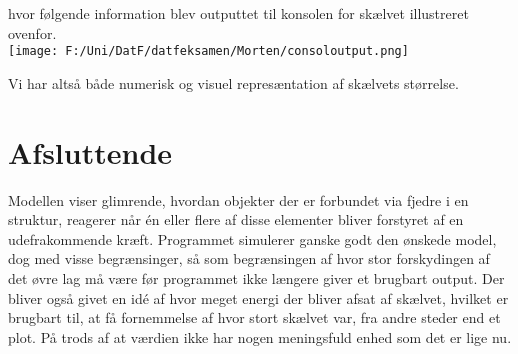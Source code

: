 \documentclass[12pt]{article}
\begin{document}
hvor følgende information blev outputtet til konsolen for skælvet illustreret ovenfor.\\

\texttt{[image: F:/Uni/DatF/datfeksamen/Morten/consoloutput.png]}

Vi har altså både numerisk og visuel represæntation af skælvets størrelse.


\section{Afsluttende}
Modellen viser glimrende, hvordan objekter der er forbundet via fjedre i en struktur, reagerer når én eller flere af disse elementer bliver forstyret af en udefrakommende kræft. Programmet simulerer ganske godt den ønskede model, dog med visse begrænsinger, så som begrænsingen af hvor stor forskydingen af det øvre lag må være før programmet ikke længere giver et brugbart output. Der bliver også givet en idé af hvor meget energi der bliver afsat af skælvet, hvilket er brugbart til, at få fornemmelse af hvor stort skælvet var, fra andre steder end et plot. På trods af at værdien ikke har nogen meningsfuld enhed som det er lige nu.
\end{document}
